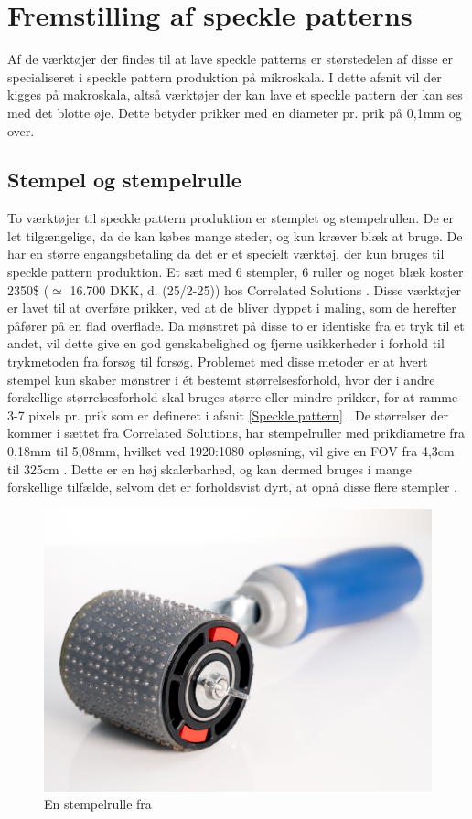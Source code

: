 \section{Fremstilling af speckle patterns}

Af de værktøjer der findes til at lave speckle patterns er størstedelen af disse er specialiseret i speckle pattern produktion på mikroskala. I dette afsnit vil der kigges på makroskala, altså værktøjer der kan lave et speckle pattern der kan ses med det blotte øje. Dette betyder prikker med en diameter pr. prik på 0,1mm og over.

\subsection{Stempel og stempelrulle} To værktøjer til speckle pattern produktion er stemplet og stempelrullen. De er let tilgængelige, da de kan købes mange steder, og kun kræver blæk at bruge. De har en større engangsbetaling da det er et specielt værktøj, der kun bruges til speckle pattern produktion. Et sæt med 6 stempler, 6 ruller og noget blæk koster 2350\$ ($\simeq$ 16.700 DKK, d. (25/2-25)) hos Correlated Solutions \parencite{CorrelatedSolutionsVICCorrelation}. Disse værktøjer er lavet til at overføre prikker, ved at de bliver dyppet i maling, som de herefter påfører på en flad overflade. Da mønstret på disse to er identiske fra et tryk til et andet, vil dette give en god genskabelighed og fjerne usikkerheder i forhold til trykmetoden fra forsøg til forsøg. Problemet med disse metoder er at hvert stempel kun skaber mønstrer i ét bestemt størrelsesforhold, hvor der i andre forskellige størrelsesforhold skal bruges større eller mindre prikker, for at ramme 3-7 pixels pr. prik som er defineret i afsnit \ref{Speckle pattern} \parencite{Dong2017ACorrelation}. De størrelser der kommer i sættet fra Correlated Solutions, har stempelruller med prikdiametre fra 0,18mm til 5,08mm, hvilket ved 1920:1080 opløsning, vil give en FOV fra 4,3cm til 325cm \parencite{CorrelatedSolutionsVICCorrelation}. Dette er en høj skalerbarhed, og kan dermed bruges i mange forskellige tilfælde, selvom det er forholdsvist dyrt, at opnå disse flere stempler \parencite{Dong2017ACorrelation}.
\begin{figure}[H]
    \centering
    \includegraphics[width=0.4\linewidth]{Sections/2 Problemanalyse/Media/Roller.png}
    \caption{En stempelrulle fra \cite{CorrelatedSolutionsVICCorrelation}}
    \label{Stempelrulle}
\end{figure}

